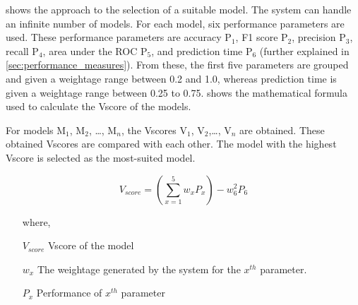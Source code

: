  shows the approach to the selection of a suitable model. The system can handle an infinite number of models. For each model, six performance parameters are used. These performance parameters are accuracy P$_1$, F1 score P$_2$, precision P$_3$, recall P$_4$, area under the ROC P$_5$, and prediction time P$_6$ (further explained in \cref{sec:performance_measures}). From these, the first five parameters are grouped and given a weightage range between 0.2 and 1.0, whereas prediction time is given a weightage range between 0.25 to 0.75.  shows the mathematical formula used to calculate the Vscore of the models.

For models M$_1$, M$_2$, \ldots, M$_n$, the Vscores V$_1$, V$_2$,\ldots, V$_n$ are obtained. These obtained Vscores are compared with each other. The model with the highest Vscore is selected as the most-suited model.

\begin{equation}\label{eq:v_score}
  V_{score} = \left(\sum_{x=1}^{5} w_xP_x\right) - w_6^2P_6
\end{equation}

\begin{itemize}
  \item[where,]
  \item[$V_{score}$] Vscore of the model
  \item[$w_x$] The weightage generated by the system for the $x^{th}$ parameter.
  \item[$P_x$] Performance of $x^{th}$ parameter
\end{itemize}

